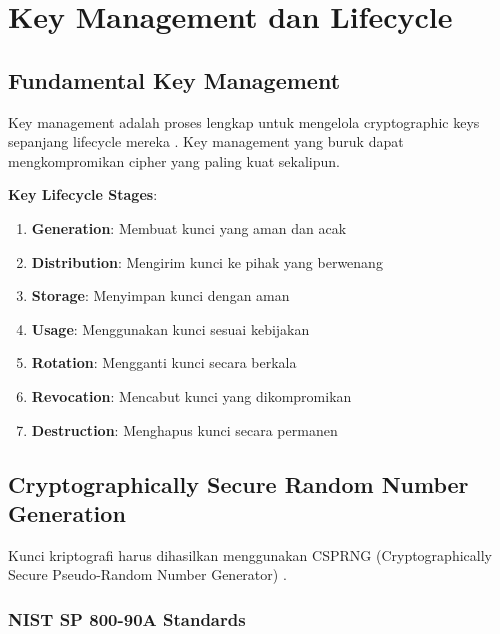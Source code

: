 ﻿\section{Key Management dan Lifecycle}

\subsection{Fundamental Key Management}

Key management adalah proses lengkap untuk mengelola cryptographic keys sepanjang lifecycle mereka \cite{nist800_57}. Key management yang buruk dapat mengkompromikan cipher yang paling kuat sekalipun.

\textbf{Key Lifecycle Stages}:
\begin{enumerate}
  \item \textbf{Generation}: Membuat kunci yang aman dan acak
  \item \textbf{Distribution}: Mengirim kunci ke pihak yang berwenang
  \item \textbf{Storage}: Menyimpan kunci dengan aman
  \item \textbf{Usage}: Menggunakan kunci sesuai kebijakan
  \item \textbf{Rotation}: Mengganti kunci secara berkala
  \item \textbf{Revocation}: Mencabut kunci yang dikompromikan
  \item \textbf{Destruction}: Menghapus kunci secara permanen
\end{enumerate}

\subsection{Cryptographically Secure Random Number Generation}

Kunci kriptografi harus dihasilkan menggunakan CSPRNG (Cryptographically Secure Pseudo-Random Number Generator) \cite{nist800_90a}.

\subsubsection{NIST SP 800-90A Standards}

